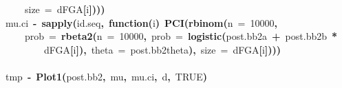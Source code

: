 \documentclass{article}
\makeatletter
\newcommand{\hlnumber}[1]{\textcolor[rgb]{0,0,0}{#1}}%
\newcommand{\hlfunctioncall}[1]{\textcolor[rgb]{.5,0,.33}{\textbf{#1}}}%
\newcommand{\hlkeyword}[1]{\textbf{#1}}%
\newcommand{\hlargument}[1]{\textcolor[rgb]{.69,.25,.02}{#1}}%
\newcommand{\hlformalargs}[1]{\hlargument{#1}}%
\newcommand{\hlassignement}[1]{\textbf{#1}}%
\newcommand{\hlsymbol}[1]{#1}%
\newcommand{\hlstd}[1]{\textcolor[rgb]{0,0,0}{#1}}%
\newenvironment{kframe}{%
 \def\FrameCommand##1{\hskip\@totalleftmargin \hskip-\fboxsep
 \colorbox{shadecolor}{##1}\hskip-\fboxsep
     \hskip-\linewidth \hskip-\@totalleftmargin \hskip\columnwidth}%
 \MakeFramed {\advance\hsize-\width
   \@totalleftmargin\z@ \linewidth\hsize
   \@setminipage}}%
 {\par\unskip\endMakeFramed}
\newenvironment{knitrout}{}{} %
\makeatother
\begin{document}
\begin{knitrout}
{\begin{kframe}
\begin{flushleft}
\hlstd{}{\ }{\ }{\ }{\ }\hlargument{size}{\ }\hlargument{=}{\ }\hlsymbol{d}\hlkeyword{\usebox{\hlnormalsizeboxdollar}}\hlsymbol{FGA}\hlkeyword{[}\hlsymbol{i}\hlkeyword{]}\hlkeyword{)}\hlkeyword{)}\hlkeyword{)}\hspace*{\fill}\\
\hlstd{}\hlsymbol{mu.ci}{\ }\hlassignement{\usebox{\hlnormalsizeboxlessthan}-}{\ }\hlfunctioncall{sapply}\hlkeyword{(}\hlsymbol{id.seq}\hlkeyword{,}{\ }\hlkeyword{function}\hlkeyword{(}\hlformalargs{i}\hlkeyword{)}{\ }\hlfunctioncall{PCI}\hlkeyword{(}\hlfunctioncall{rbinom}\hlkeyword{(}\hlargument{n}{\ }\hlargument{=}{\ }\hlnumber{10000}\hlkeyword{,}\hspace*{\fill}\\
\hlstd{}{\ }{\ }{\ }{\ }\hlargument{prob}{\ }\hlargument{=}{\ }\hlfunctioncall{rbeta2}\hlkeyword{(}\hlargument{n}{\ }\hlargument{=}{\ }\hlnumber{10000}\hlkeyword{,}{\ }\hlargument{prob}{\ }\hlargument{=}{\ }\hlfunctioncall{logistic}\hlkeyword{(}\hlsymbol{post.bb2}\hlkeyword{\usebox{\hlnormalsizeboxdollar}}\hlsymbol{a}{\ }\hlkeyword{+}{\ }\hlsymbol{post.bb2}\hlkeyword{\usebox{\hlnormalsizeboxdollar}}\hlsymbol{b}{\ }\hlkeyword{*}\hspace*{\fill}\\
\hlstd{}{\ }{\ }{\ }{\ }{\ }{\ }{\ }{\ }\hlsymbol{d}\hlkeyword{\usebox{\hlnormalsizeboxdollar}}\hlsymbol{FGA}\hlkeyword{[}\hlsymbol{i}\hlkeyword{]}\hlkeyword{)}\hlkeyword{,}{\ }\hlargument{theta}{\ }\hlargument{=}{\ }\hlsymbol{post.bb2}\hlkeyword{\usebox{\hlnormalsizeboxdollar}}\hlsymbol{theta}\hlkeyword{)}\hlkeyword{,}{\ }\hlargument{size}{\ }\hlargument{=}{\ }\hlsymbol{d}\hlkeyword{\usebox{\hlnormalsizeboxdollar}}\hlsymbol{FGA}\hlkeyword{[}\hlsymbol{i}\hlkeyword{]}\hlkeyword{)}\hlkeyword{)}\hlkeyword{)}\hspace*{\fill}\\
\hlstd{}\hspace*{\fill}\\
\hlstd{}\hlsymbol{tmp}{\ }\hlassignement{\usebox{\hlnormalsizeboxlessthan}-}{\ }\hlfunctioncall{Plot1}\hlkeyword{(}\hlsymbol{post.bb2}\hlkeyword{,}{\ }\hlsymbol{mu}\hlkeyword{,}{\ }\hlsymbol{mu.ci}\hlkeyword{,}{\ }\hlsymbol{d}\hlkeyword{,}{\ }\hlnumber{TRUE}\hlkeyword{)}\mbox{}
\normalfont
\end{flushleft}

\end{kframe}}
\end{knitrout}
\end{document}
